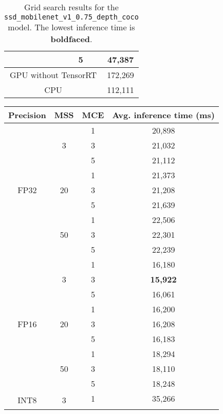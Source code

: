 \begin{table}[]
\begin{tabular}{cccc}
		\multicolumn{1}{|c|}{}   & \multicolumn{1}{c|}{}          & \multicolumn{1}{c|}{5}  & \multicolumn{1}{c|}{47,387}    \\ \hline
		\multicolumn{3}{|c|}{GPU without TensorRT}       & \multicolumn{1}{c|}{172,269}   \\ \hline
		\multicolumn{3}{|c|}{CPU}        & \multicolumn{1}{c|}{112,111}   \\ \hline
	\end{tabular}
	\caption{Grid search results for the \texttt{ssd\_mobilenet\_v1\_0.75\_depth\_coco} model. The lowest inference time is \textbf{boldfaced}.}
	\label{tab:4_ssd_trt_results}
\end{table}


\begin{table}[]
	\begin{tabular}{|c|c|c|c|}
		\hline
		\textbf{Precision}    & \textbf{MSS}        & \textbf{MCE} & \textbf{Avg. inference time (ms)} \\ \hline
		\multirow{9}{*}{FP32} & \multirow{3}{*}{3}  & 1  & 20,898    \\ \cline{3-4} 
		&  & 3  & 21,032    \\ \cline{3-4} 
		&  & 5  & 21,112    \\ \cline{2-4} 
		& \multirow{3}{*}{20} & 1  & 21,373    \\ \cline{3-4} 
		&  & 3  & 21,208    \\ \cline{3-4} 
		&  & 5  & 21,639    \\ \cline{2-4} 
		& \multirow{3}{*}{50} & 1  & 22,506    \\ \cline{3-4} 
		&  & 3  & 22,301    \\ \cline{3-4} 
		&  & 5  & 22,239    \\ \hline
		\multirow{9}{*}{FP16} & \multirow{3}{*}{3}  & 1  & 16,180    \\ \cline{3-4} 
		&  & 3  & \textbf{15,922  }  \\ \cline{3-4} 
		&  & 5  & 16,061    \\ \cline{2-4} 
		& \multirow{3}{*}{20} & 1  & 16,200    \\ \cline{3-4} 
		&  & 3  & 16,208    \\ \cline{3-4} 
		&  & 5  & 16,183    \\ \cline{2-4} 
		& \multirow{3}{*}{50} & 1  & 18,294    \\ \cline{3-4} 
		&  & 3  & 18,110    \\ \cline{3-4} 
		&  & 5  & 18,248    \\ \hline
		\multirow{9}{*}{INT8} & \multirow{3}{*}{3}  & 1  & 35,266    \\ \cline{3-4} 

\end{tabular}
\end{table}
